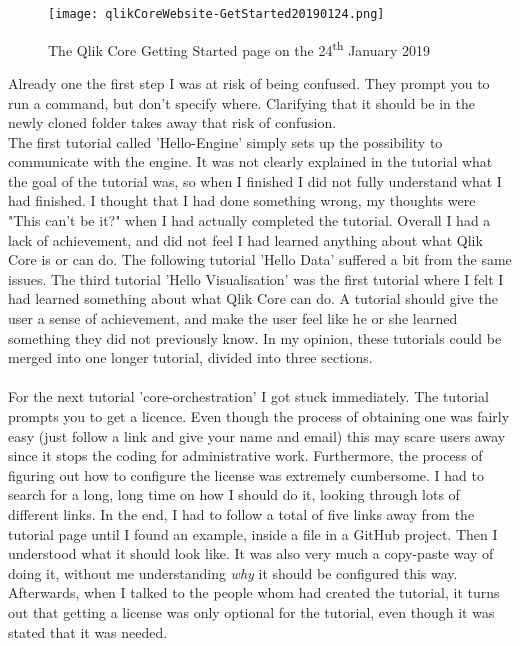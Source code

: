 \documentclass{cslthse-msc}
\begin{document}
    \begin{figure}[H]
        \centering
        \texttt{[image: qlikCoreWebsite-GetStarted20190124.png]}
        \caption{The Qlik Core Getting Started page on the 24\textsuperscript{th} January 2019}
        \label{fig:gettingstarted}
    \end{figure}
    Already one the first step I was at risk of being confused. They prompt you to run a command, but don't specify where. Clarifying that it should be in the newly cloned folder takes away that risk of confusion.\\
    The first tutorial called 'Hello-Engine' simply sets up the possibility to communicate with the engine. It was not clearly explained in the tutorial what the goal of the tutorial was, so when I finished I did not fully understand what I had finished. I thought that I had done something wrong, my thoughts were "This can't be it?" when I had actually completed the tutorial. Overall I had a lack of achievement, and did not feel I had learned anything about what Qlik Core is or can do. The following tutorial 'Hello Data' suffered a bit from the same issues. The third tutorial 'Hello Visualisation' was the first tutorial where I felt I had learned something about what Qlik Core can do. A tutorial should give the user a sense of achievement, and make the user feel like he or she learned something they did not previously know. In my opinion, these tutorials could be merged into one longer tutorial, divided into three sections. \\\\
    For the next tutorial 'core-orchestration' I got stuck immediately. The tutorial prompts you to get a licence. Even though the process of obtaining one was fairly easy (just follow a link and give your name and email) this may scare users away since it stops the coding for administrative work. Furthermore, the process of figuring out how to configure the license was extremely cumbersome. I had to search for a long, long time on how I should do it, looking through lots of different links. In the end, I had to follow a total of five links away from the tutorial page until I found an example, inside a file in a GitHub project. Then I understood what it should look like. It was also very much a copy-paste way of doing it, without me understanding \textit{why} it should be configured this way. Afterwards, when I talked to the people whom had created the tutorial, it turns out that getting a license was only optional for the tutorial, even though it was stated that it was needed.\\\\
\end{document}
